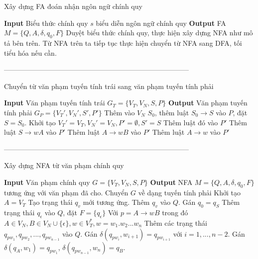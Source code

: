 \documentclass[12pt,a4paper]{article}
\begin{document}
\begin{algorithm}[H]
\caption{Xây dựng FA đoán nhận ngôn ngữ chính quy}
\begin{algorithmic} 
\STATE \textbf{Input} Biểu thức chính quy $s$ biểu diễn ngôn ngữ chính quy
\STATE \textbf{Output} FA $M = \{Q, A, \delta, q_0, F\}$
\STATE Duyệt biểu thức chính quy, thực hiện xây dựng NFA như mô tả bên trên.
\STATE Từ NFA trên ta tiếp tục thực hiện chuyển từ NFA sang DFA, tối tiểu hóa nếu cần.
\end{algorithmic}
\end{algorithm}
--------------------------------------------------------------------------------\\
\begin{algorithm}[H]
\caption{Chuyển từ văn phạm tuyến tính trái sang văn phạm tuyến tính phải}
\begin{algorithmic} 
\STATE \textbf{Input} Văn phạm tuyến tính trái $G_T = \{V_T, V_N, S, P\}$
\STATE \textbf{Output} Văn phạm tuyến tính phải $G_P = \{V_T', V_N', S', P'\}$
\STATE Thêm vào $V_N$ $S_0$, thêm luật $S_0 \rightarrow S$ vào $P$, đặt $S = S_0$.
\ENDIF
\STATE Khởi tạo $V_T' = V_T, V_N' = V_N, P' = \emptyset, S' = S$
\STATE Thêm luật đó vào $P'$
\STATE Thêm luật $S \rightarrow wA$ vào $P'$
\STATE Thêm luật $A \rightarrow wB$ vào $P'$
\STATE Thêm luật $A \rightarrow w$ vào $P'$
\ENDIF
\ENDFOR
\end{algorithmic}
\end{algorithm}

--------------------------------------------------------------------------------\\
\begin{algorithm}[H]
\caption{Xây dựng NFA từ văn phạm chính quy}
\begin{algorithmic} 
\STATE \textbf{Input} Văn phạm chính quy $G = \{V_T, V_N, S, P\}$
\STATE \textbf{Output} NFA $M = \{Q, A, \delta, q_0, F\}$ tương ứng với văn phạm đã cho.
\STATE Chuyển $G$ về dạng tuyến tính phải
\ENDIF
\STATE Khởi tạo $A = V_T$
\STATE Tạo trạng thái $q_{v}$ mới tương ứng.
\STATE Thêm $q_{v}$ vào $Q$.
\ENDFOR
\STATE Gán $q_0 = q_S$
\STATE Thêm trạng thái $q_\epsilon$ vào $Q$, đặt $F = \{q_\epsilon\}$
\STATE Với $p = A \rightarrow wB$ trong đó $A \in V_N, B \in V_N \cup \{\epsilon\}, w \in V_T^*, w = w_1.w_2...w_n$
\STATE Thêm các trạng thái $q_{pw_1}, q_{pw_2}, ..., q_{pw_{n-1}}$ vào $Q$.
\STATE Gán $\delta(q_{pw_i}, w_{i+1}) = q_{pw_{i+1}}$ với $i=1,...,n-2$.
\STATE Gán $\delta(q_A, w_1) = q_{pw_1}$, $\delta(q_{pw_{n-1}}, w_n) = q_B$.
\ENDFOR
\end{algorithmic}
\end{algorithm}
\end{document}
